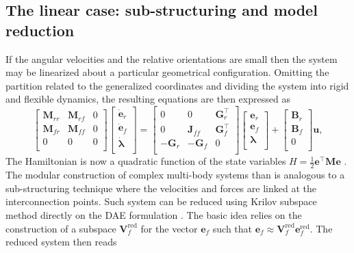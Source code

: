 \documentclass{svjour3}                     %
\begin{document}
\subsection{The linear case: sub-structuring and model reduction}
If the angular velocities and the relative orientations are small then the system may be linearized about a particular geometrical configuration. Omitting the partition related to the generalized coordinates and dividing the system into rigid and flexible dynamics, the resulting equations are then expressed as 
\begin{equation}
\label{eq:mbd_linear}
\begin{bmatrix}
\bm{M}_{rr} & \bm{M}_{rf} & 0 \\ 
\bm{M}_{fr} & \bm{M}_{ff} & 0 \\
0 & 0 & 0 \\
\end{bmatrix}
\begin{bmatrix}
\dot{\bm{e}}_r \\ \dot{\bm{e}}_f \\ \dot{\bm{\lambda}} \\ 
\end{bmatrix} = 
\begin{bmatrix}
0 & 0 & \bm{G}_r^\top \\ 
0 & \bm{J}_{ff} & \bm{G}_f^\top \\ 
-\bm{G}_r & -\bm{G}_f & 0 \\
\end{bmatrix}
\begin{bmatrix}
\bm{e}_r \\ \bm{e}_f \\ {\bm{\lambda}} \\ 
\end{bmatrix} + 
\begin{bmatrix}
\bm{B}_r \\ \bm{B}_f \\ 0 \\
\end{bmatrix}\bm{u},
\end{equation}
The Hamiltonian is now a quadratic function of the state variables $H = \frac{1}{2} \bm{e}^\top\bm{M}\bm{e}$ \cite{beattie2018linear}.
The modular construction of complex multi-body systems than is analogous to a sub-structuring technique \cite{substructuring} where the velocities and forces are linked at the interconnection points. Such system can be reduced using Krilov subspace method directly on the DAE formulation \cite{phdae_red}. The basic idea relies on the construction of a subspace $\bm{V}_f^{\text{red}}$ for the vector $\bm{e}_f$ such that $\bm{e}_f \approx \bm{V}_f^{\text{red}} \bm{e}_f^{\text{red}}$. The reduced system then reads
\end{document}
